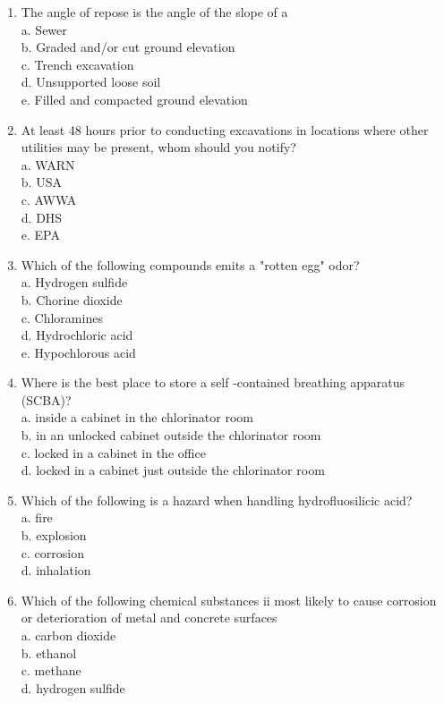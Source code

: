 \begin{enumerate}[1.]
\item The angle of repose is the angle of the slope of a\\
a. Sewer\\
b. Graded and/or cut ground elevation\\
c. Trench excavation\\
d. Unsupported loose soil\\
e. Filled and compacted ground elevation\\

\item At least 48 hours prior to conducting excavations in locations where other utilities may be present, whom should you notify?\\
a. WARN\\
b. USA\\
c. AWWA\\
d. DHS\\
e. EPA\\

\item Which of the following compounds emits a "rotten egg" odor?\\
a. Hydrogen sulfide\\
b. Chorine dioxide\\
c. Chloramines\\
d. Hydrochloric acid\\
e. Hypochlorous acid\\

\item Where is the best place to store a self -contained breathing apparatus (SCBA)?\\
a.	inside a cabinet in the chlorinator room\\
b.	in  an unlocked cabinet outside the chlorinator room\\
c.	locked in a cabinet in the office\\
d.	locked in a cabinet just outside the chlorinator room\\

\item Which of the following is a hazard when handling hydrofluosilicic acid?\\
a.	fire\\
b.	explosion\\
c.	corrosion\\
d.	inhalation\\

\item Which of the following chemical substances ii most likely to cause corrosion or deterioration of metal and concrete surfaces\\
a.	carbon dioxide\\
b.	ethanol\\
c.	methane\\
d.	hydrogen sulfide\\



\end{enumerate}

